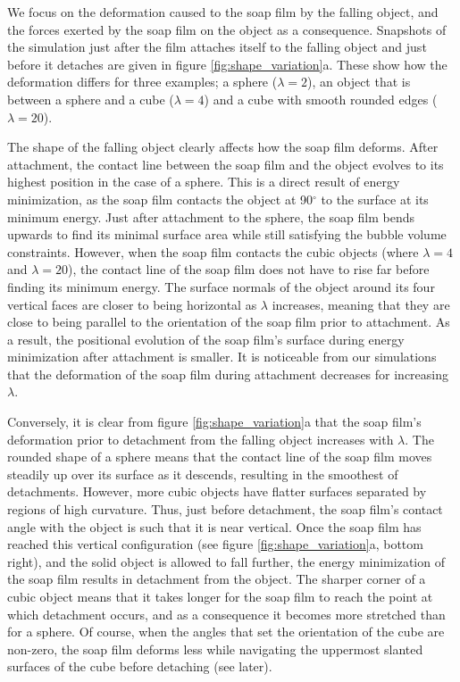 \documentclass[preprint]{revtex4-1}
\begin{document}
We focus on the deformation caused to the soap film by the falling object, and the forces exerted by the soap film on the object as a consequence. Snapshots of the simulation just after the film attaches itself to the falling object and just before it detaches are given in figure \ref{fig:shape_variation}a. These show how the deformation differs for three examples; a sphere ($\lambda=2$), an object that is between a sphere and a cube ($\lambda=4$) and a cube with smooth rounded edges ($\lambda=20$). 

The shape of the falling object clearly affects how the soap film deforms. After attachment, the contact line between the soap film and the object evolves to its highest position in the case of a sphere. This is a direct result of energy minimization, as the soap film contacts the object at 90$^{\circ}$ to the surface at its minimum energy. Just after attachment to the sphere, the soap film bends upwards to find its minimal surface area while still satisfying the bubble volume constraints. However, when the soap film contacts the cubic objects (where $\lambda=4$ and $\lambda=20$), the contact line of the soap film does not have to rise far before finding its minimum energy. The surface normals of the object around its four vertical faces are closer to being horizontal as $\lambda$ increases,  meaning that they are close to being parallel to the orientation of the soap film prior to attachment. As a result, the positional evolution of the soap film's surface during energy minimization after attachment is smaller. It is noticeable from our simulations that the deformation of the soap film during attachment decreases for increasing $\lambda$. 

Conversely, it is clear from figure \ref{fig:shape_variation}a that the soap film's deformation prior to detachment from the falling object increases with $\lambda$. The rounded shape of a sphere means that the contact line of the soap film moves steadily up over its surface as it descends, resulting in the smoothest of detachments. However, more cubic objects have flatter surfaces separated by regions of high curvature. Thus, just before detachment, the soap film's contact angle with the object is such that it is near vertical. Once the soap film has reached this vertical configuration (see figure \ref{fig:shape_variation}a, bottom right), and the solid object is allowed to fall further, the energy minimization of the soap film results in detachment from the object. The sharper corner of a cubic object means that it takes longer for the soap film to reach the point at which detachment occurs, and as a consequence it becomes more stretched than for a sphere. Of course, when the angles that set the orientation of the cube are non-zero, the soap film deforms less while navigating the uppermost slanted surfaces of the cube before detaching (see later). 
\end{document}
